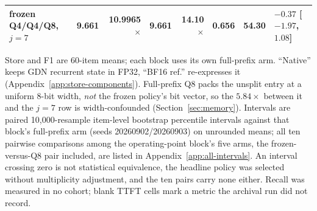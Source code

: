 \begin{table}[t]
\begin{tabular}{@{}lrrrrrrl@{}}
\qcomem{} frozen Q4/Q4/Q8, $j=7$ & 9.661 & 10.9965$\times$ & 9.661 & 14.10$\times$ & 0.656 & 54.30 & $-0.37$ [$-1.97$, $1.08$] \\
\bottomrule
\end{tabular}
\vspace{0.5mm}
\parbox{0.97\textwidth}{\scriptsize Store and F1 are 60-item means; each block uses its own full-prefix arm.
``Native'' keeps GDN recurrent state in FP32, ``BF16 ref.'' re-expresses it
(Appendix~\ref{app:store-components}).  Full-prefix Q8 packs the
unsplit entry at a uniform 8-bit width, \emph{not} the frozen policy's bit
vector, so the $5.84\times$ between it and the $j=7$ row is width-confounded
(Section~\ref{sec:memory}).  Intervals are paired
10,000-resample item-level bootstrap percentile intervals against that block's
full-prefix arm (seeds 20260902/20260903) on unrounded means; all ten pairwise
comparisons among the operating-point block's five arms, the frozen-versus-Q8
pair included, are listed in Appendix~\ref{app:all-intervals}.  An interval
crossing zero is not statistical equivalence, the headline policy was selected
without multiplicity adjustment, and the ten pairs carry none either.  Recall was
measured in no cohort; blank TTFT cells mark a metric the archival run did not
record.}
\end{table}
